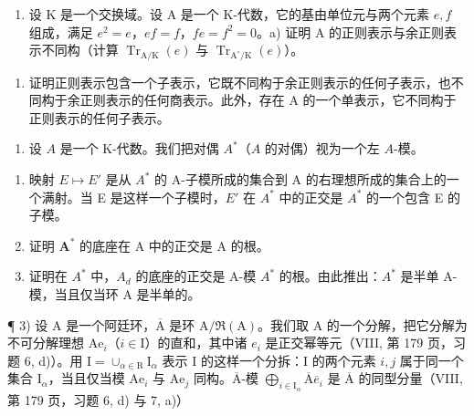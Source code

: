 
\begin{enumerate}
\def\labelenumi{\arabic{enumi})}
\tightlist
\item
  设 \(\mathrm{K}\) 是一个交换域。设 \(\mathrm{A}\) 是一个 K-代数，它的基由单位元与两个元素 \(e, f\) 组成，满足 \(e^2 = e\)，\(ef = f\)，\(fe = f^2 = 0\)。a) 证明 \(\mathrm{A}\) 的正则表示与余正则表示不同构（计算 \(\operatorname{Tr}_{\mathrm{A / K}}(e)\) 与 \(\operatorname{Tr}_{\mathrm{A}^{\circ} / \mathrm{K}}(e)\)）。
\end{enumerate}

\begin{enumerate}
\def\labelenumi{\alph{enumi})}
\setcounter{enumi}{1}
\tightlist
\item
  证明正则表示包含一个子表示，它既不同构于余正则表示的任何子表示，也不同构于余正则表示的任何商表示。此外，存在 A 的一个单表示，它不同构于正则表示的任何子表示。
\end{enumerate}

\begin{enumerate}
\def\labelenumi{\arabic{enumi})}
\setcounter{enumi}{1}
\tightlist
\item
  设 \(A\) 是一个 K-代数。我们把对偶 \(A^*\)（\(A\) 的对偶）视为一个左 \(A\)-模。
\end{enumerate}

\begin{enumerate}
\def\labelenumi{\alph{enumi})}
\item
  映射 \(E \mapsto E'\) 是从 \(A^{*}\) 的 A-子模所成的集合到 A 的右理想所成的集合上的一个满射。当 E 是这样一个子模时，\(E'\) 在 \(A^{*}\) 中的正交是 \(A^{*}\) 的一个包含 E 的子模。
\item
  证明 \(\mathbf{A}^*\) 的底座在 A 中的正交是 A 的根。
\item
  证明在 \(A^{*}\) 中，\(A_{d}\) 的底座的正交是 A-模 \(A^{*}\) 的根。由此推出：\(A^{*}\) 是半单 A-模，当且仅当环 A 是半单的。
\end{enumerate}

¶ 3) 设 A 是一个阿廷环，\(\overline{\mathrm{A}}\) 是环 \(\mathrm{A} / \Re (\mathrm{A})\)。我们取 A 的一个分解，把它分解为不可分解理想 \(\mathrm{Ae}_i\)（\(i\in \mathrm{I}\)）的直和，其中诸 \(e_i\) 是正交幂等元（VIII, 第 179 页，习题 6, d)）。用 \(\mathrm{I} = \cup_{\alpha \in \mathrm{R}}\mathrm{I}_{\alpha}\) 表示 I 的这样一个分拆：I 的两个元素 \(i,j\) 属于同一个集合 \(\mathrm{I}_{\alpha}\)，当且仅当模 \(\mathrm{Ae}_i\) 与 \(\mathrm{Ae}_j\) 同构。\(\overline{\mathrm{A}}\)-模 \(\bigoplus_{i\in \mathrm{I}_{\alpha}}\overline{\mathrm{A}}\overline{e}_i\) 是 \(\overline{\mathrm{A}}\) 的同型分量（VIII, 第 179 页，习题 6, d) 与 7, a)）

